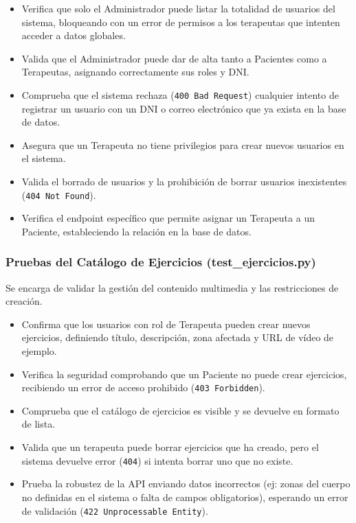 \begin{itemize}
    \item Verifica que solo el Administrador puede listar la totalidad de usuarios del sistema, bloqueando con un error de permisos a los terapeutas que intenten acceder a datos globales.
    \item Valida que el Administrador puede dar de alta tanto a Pacientes como a Terapeutas, asignando correctamente sus roles y DNI.
    \item Comprueba que el sistema rechaza (\texttt{400 Bad Request}) cualquier intento de registrar un usuario con un DNI o correo electrónico que ya exista en la base de datos.
    \item Asegura que un Terapeuta no tiene privilegios para crear nuevos usuarios en el sistema.
    \item Valida el borrado de usuarios y la prohibición de borrar usuarios inexistentes (\texttt{404 Not Found}).
    \item Verifica el endpoint específico que permite asignar un Terapeuta a un Paciente, estableciendo la relación en la base de datos.
\end{itemize}

\subsubsection{Pruebas del Catálogo de Ejercicios (test\_ejercicios.py)}
Se encarga de validar la gestión del contenido multimedia y las restricciones de creación.

\begin{itemize}
    \item Confirma que los usuarios con rol de Terapeuta pueden crear nuevos ejercicios, definiendo título, descripción, zona afectada y URL de vídeo de ejemplo.
    \item Verifica la seguridad comprobando que un Paciente no puede crear ejercicios, recibiendo un error de acceso prohibido (\texttt{403 Forbidden}).
    \item Comprueba que el catálogo de ejercicios es visible y se devuelve en formato de lista.
    \item Valida que un terapeuta puede borrar ejercicios que ha creado, pero el sistema devuelve error (\texttt{404}) si intenta borrar uno que no existe.
    \item Prueba la robustez de la API enviando datos incorrectos (ej: zonas del cuerpo no definidas en el sistema o falta de campos obligatorios), esperando un error de validación (\texttt{422 Unprocessable Entity}).
\end{itemize}

